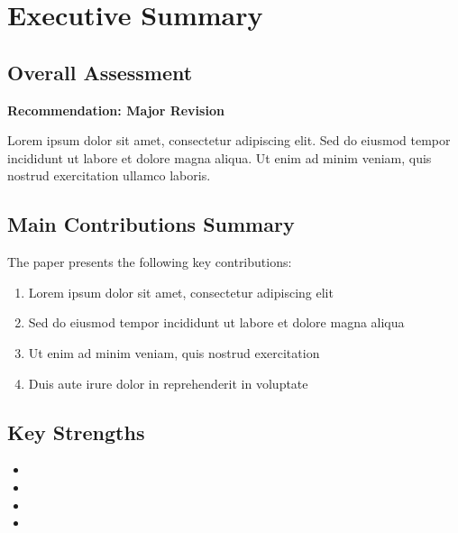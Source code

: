 \section{Executive Summary}
\label{sec:executive_summary}

\subsection{Overall Assessment}
\textbf{Recommendation: Major Revision}

Lorem ipsum dolor sit amet, consectetur adipiscing elit. Sed do eiusmod tempor incididunt ut labore et dolore magna aliqua. Ut enim ad minim veniam, quis nostrud exercitation ullamco laboris.

\subsection{Main Contributions Summary}
The paper presents the following key contributions:
\begin{enumerate}
    \item Lorem ipsum dolor sit amet, consectetur adipiscing elit
    \item Sed do eiusmod tempor incididunt ut labore et dolore magna aliqua
    \item Ut enim ad minim veniam, quis nostrud exercitation
    \item Duis aute irure dolor in reprehenderit in voluptate
\end{enumerate}

\subsection{Key Strengths}
\begin{itemize}
    \item {}
    \item {}
    \item {}
    \item {}
\end{itemize}

